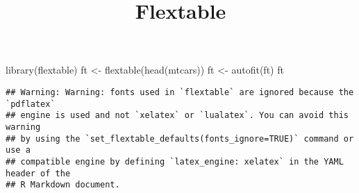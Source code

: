 \documentclass[
]{article}
\title{Flextable}
\author{}
\date{\vspace{-2.5em}}
\newenvironment{Shaded}{\begin{snugshade}}{\end{snugshade}}
\newcommand{\FunctionTok}[1]{\textcolor[rgb]{0.00,0.00,0.00}{#1}}
\newcommand{\NormalTok}[1]{#1}
\newcommand{\OtherTok}[1]{\textcolor[rgb]{0.56,0.35,0.01}{#1}}
\begin{document}
\maketitle

\begin{Shaded}
\begin{Highlighting}[]
\FunctionTok{library}\NormalTok{(flextable)}
\NormalTok{ft }\OtherTok{\textless{}{-}} \FunctionTok{flextable}\NormalTok{(}\FunctionTok{head}\NormalTok{(mtcars))}
\NormalTok{ft }\OtherTok{\textless{}{-}} \FunctionTok{autofit}\NormalTok{(ft)}
\NormalTok{ft}
\end{Highlighting}
\end{Shaded}

\begin{verbatim}
## Warning: Warning: fonts used in `flextable` are ignored because the `pdflatex`
## engine is used and not `xelatex` or `lualatex`. You can avoid this warning
## by using the `set_flextable_defaults(fonts_ignore=TRUE)` command or use a
## compatible engine by defining `latex_engine: xelatex` in the YAML header of the
## R Markdown document.
\end{verbatim}

\providecommand{\docline}[3]{\noalign{\global\setlength{\arrayrulewidth}{#1}}\arrayrulecolor[HTML]{#2}\cline{#3}}

\setlength{\tabcolsep}{8pt}

\renewcommand*{\arraystretch}{1.5}

\centering
\end{document}
